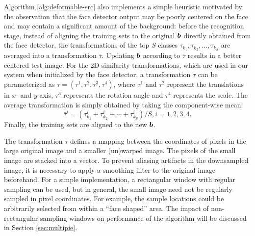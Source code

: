 Algorithm \ref{alg:deformable-src} also implements a simple heuristic
motivated by the observation that the face detector output may be poorly
centered on the face and may contain a significant amount of the background:
before the recognition stage, instead of aligning the training sets to the
original $\boldsymbol{b}$ directly obtained from the face detector, the transformations of
the top $S$ classes $\tau_{k_1}, \tau_{k_2}, \ldots, \tau_{k_S}$ are averaged
into a transformation $\bar{\tau}$.  Updating $\boldsymbol{b}$ according to $\bar{\tau}$
results in a better centered test image. For the 2D similarity transformations,
which are used in our system when initialized by the face detector, a
transformation $\tau$ can be parameterized as $\tau = (\tau^1, \tau^2, \tau^3,
\tau^4)$, where $\tau^1$ and $\tau^2$ represent the translations in $x$- and
$y$-axis, $\tau^3$ represents the rotation angle and $\tau^4$ represents the
scale. The average transformation is simply obtained by taking the
component-wise mean:
\begin{displaymath}
\bar{\tau}^i = (\tau_{k_1}^i + \tau_{k_2}^i + \cdots +
\tau_{k_S}^i) / S, i = 1,2,3,4.
\end{displaymath}
Finally, the training sets are aligned to the new $\boldsymbol{b}$.



The transformation $\tau$ defines a mapping between the coordinates of pixels
in the large original image and a smaller (un)warped image. The pixels of the
small image are stacked into a vector. To prevent aliasing artifacts in the
downsampled image, it is necessary to apply a smoothing filter to the original
image beforehand. For a simple implementation, a rectangular window with
regular sampling can be used, but in general, the small image need not be
regularly sampled in pixel coordinates.  For example, the sample locations
could be arbitrarily selected from within a ``face shaped'' area. The impact of
non-rectangular sampling windows on performance of the algorithm will be
discussed in Section \ref{sec:multipie}.

